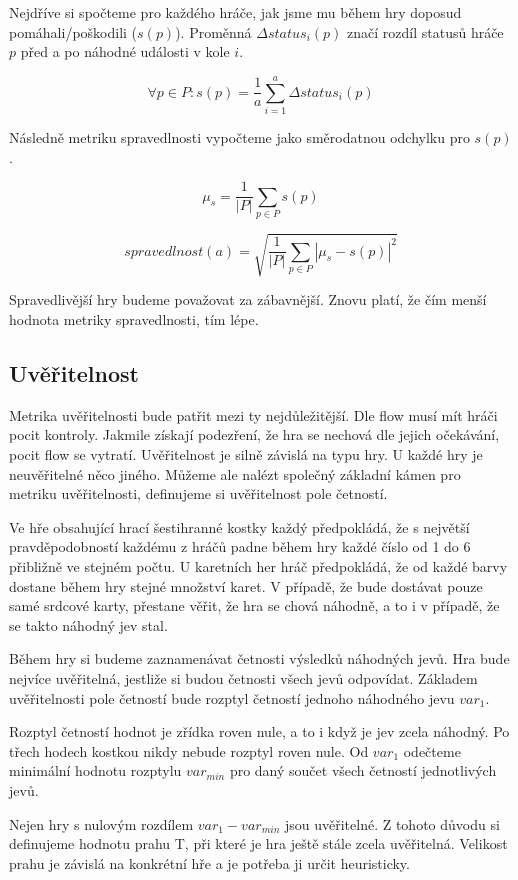Nejdříve si spočteme pro každého hráče, jak jsme mu během hry doposud pomáhali/poškodili ($s(p)$). Proměnná $\Delta status_i(p)$ značí rozdíl statusů hráče $p$ před a po náhodné události v kole $i$.

	\[
	\forall p \in P : s(p) = \frac{1}{a}\sum_{i=1}^a \Delta status_i(p)
\]

Následně metriku spravedlnosti vypočteme jako směrodatnou odchylku pro $s(p)$.

	\[
	\mu_s = \frac{1}{|P|}\sum_{p \in P} s(p)
\]

	\[
	spravedlnost(a) = \sqrt{\frac{1}{|P|}\sum_{p \in P} |\mu_s - s(p)|^2}
\]

Spravedlivější hry budeme považovat za zábavnější. Znovu platí, že čím menší hodnota metriky spravedlnosti, tím lépe.

\subsection{Uvěřitelnost}

Metrika uvěřitelnosti bude patřit mezi ty nejdůležitější. Dle flow musí mít hráči pocit kontroly. Jakmile získají podezření, že hra se nechová dle jejich očekávání, pocit flow se vytratí. Uvěřitelnost je silně závislá na typu hry. U každé hry je neuvěřitelné něco jiného. Můžeme ale nalézt společný základní kámen pro metriku uvěřitelnosti, definujeme si uvěřitelnost pole četností.

Ve hře obsahující hrací šestihranné kostky každý předpokládá, že s největší pravděpodobností každému z hráčů padne během hry každé číslo od 1 do 6 přibližně ve stejném počtu. U karetních her hráč předpokládá, že od každé barvy dostane během hry stejné množství karet. V případě, že bude dostávat pouze samé srdcové karty, přestane věřit, že hra se chová náhodně, a to i v případě, že se takto náhodný jev stal.

Během hry si budeme zaznamenávat četnosti výsledků náhodných jevů. Hra bude nejvíce uvěřitelná, jestliže si budou četnosti všech jevů odpovídat. Základem uvěřitelnosti pole četností bude rozptyl četností jednoho náhodného jevu $var_1$.

Rozptyl četností hodnot je zřídka roven nule, a to i když je jev zcela náhodný. Po třech hodech kostkou nikdy nebude rozptyl roven nule. Od $var_1$ odečteme minimální hodnotu rozptylu $var_{min}$ pro daný součet všech četností jednotlivých jevů.

Nejen hry s nulovým rozdílem $var_1 - var_{min}$ jsou uvěřitelné. Z tohoto důvodu si definujeme hodnotu prahu T, při které je hra ještě stále zcela uvěřitelná. Velikost prahu je závislá na konkrétní hře a je potřeba ji určit heuristicky.

